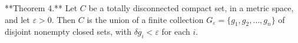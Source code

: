 **Theorem 4.** Let $C$ be a totally disconnected compact set, in a metric space, and let $\varepsilon > 0$. Then $C$ is the union of a finite collection $G_\varepsilon = \{g_1, g_2, \ldots, g_n\}$ of disjoint nonempty closed sets, with $\delta g_i < \varepsilon$ for each $i$.
